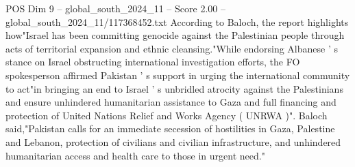 \begin{textsample}{POS Dim 9 – global\_south\_2024\_11 – Score 2.00 – global\_south\_2024\_11/117368452.txt}
According to Baloch, the report highlights how"Israel has been committing genocide against the Palestinian people through acts of territorial expansion and ethnic cleansing."While endorsing Albanese ' s stance on Israel obstructing international investigation efforts, the FO spokesperson affirmed Pakistan ' s support in urging the international community to act"in bringing an end to Israel ' s unbridled atrocity against the Palestinians and ensure unhindered humanitarian assistance to Gaza and full financing and protection of United Nations Relief and Works Agency ( UNRWA )".
Baloch said,"Pakistan calls for an immediate secession of hostilities in Gaza, Palestine and Lebanon, protection of civilians and civilian infrastructure, and unhindered humanitarian access and health care to those in urgent need."

\end{textsample}
